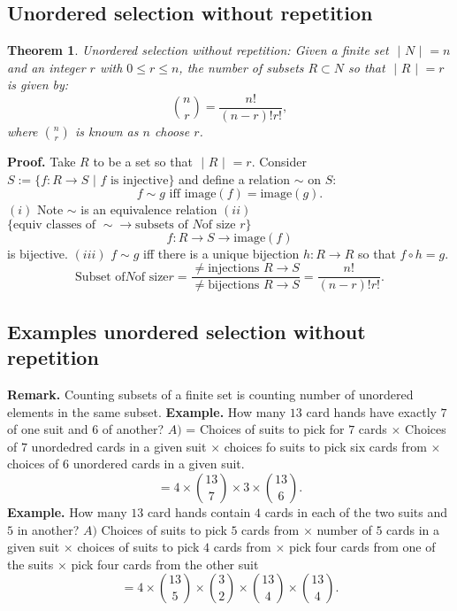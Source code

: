 \documentclass{article}
\newtheorem{theorem}{Theorem}                                       %
\begin{document}
\subsection{Unordered selection without repetition}
\begin{theorem}
  Unordered selection without repetition: Given a finite set $\text{ | }N\text{ | } = n$ and an
  integer $r$ with $0 \leq r \leq n$, the number of subsets $R \subset N$ so that $\text{ | }R\text{ | } = r$ is
  given by:
  $$\binom{n}{r} = \frac{n!}{(n - r)!r!},$$ where $\binom{n}{r}$ is known as $n$ choose $r$.
\end{theorem}
\textbf{Proof. } Take $R$ to be a set so that $\text{ | }R\text{ | } = r$. 
\newline
Consider $S := \{ f: R \rightarrow S \text{ | } f \text{ is injective}\}$ and define a relation $\sim$ on $S$:
$$f \sim g \text{ iff image}(f) = \text{image}(g).$$
$(i) $ Note $\sim$ is an equivalence relation 
\newline
$(ii) $ $\{\text{equiv classes of }\sim \rightarrow \text{subsets of } N \text{of size } r\}$
$$f: R \rightarrow S \rightarrow \text{image}(f)$$ is bijective.
\newline
$(iii) $ $f \sim g$ iff there is a unique bijection $h: R \rightarrow R$ so that $f \circ h = g$.
$$\text{Subset of} N \text{of size} r = \frac{\not = \text{injections } R \rightarrow S}{\not = \text{bijections } R \rightarrow S} = \frac{n!}{(n - r)!r!}.$$
\newpage
\subsection{Examples unordered selection without repetition}
\textbf{Remark. } Counting subsets of a finite set is counting number of unordered elements in the same subset.
\newline
\newline
\textbf{Example. } How many $13$ card hands have exactly $7$ of one suit and $6$ of another?
\newline
$A) $ = Choices of suits to pick for $7$ cards $\times $ Choices of $7$ unordedred cards in a given suit 
$\times $ choices fo suits to pick six cards from $\times $ choices of $6$ unordered cards in a given suit.
$$ = 4 \times \binom{13}{7} \times 3 \times \binom{13}{6}.$$
\textbf{Example. } How many $13$ card hands contain $4$ cards in each of the two suits and $5$ in another?
\newline
$A) $ Choices of suits to pick $5$ cards from $\times $ number of $5$ cards in a given suit $\times $ choices of suits to pick $4$ cards from 
$\times $ pick four cards from one of the suits $\times $ pick four cards from the other suit
$$ = 4 \times \binom{13}{5} \times \binom{3}{2} \times \binom{13}{4} \times \binom{13}{4} .$$
\newpage
\end{document}

